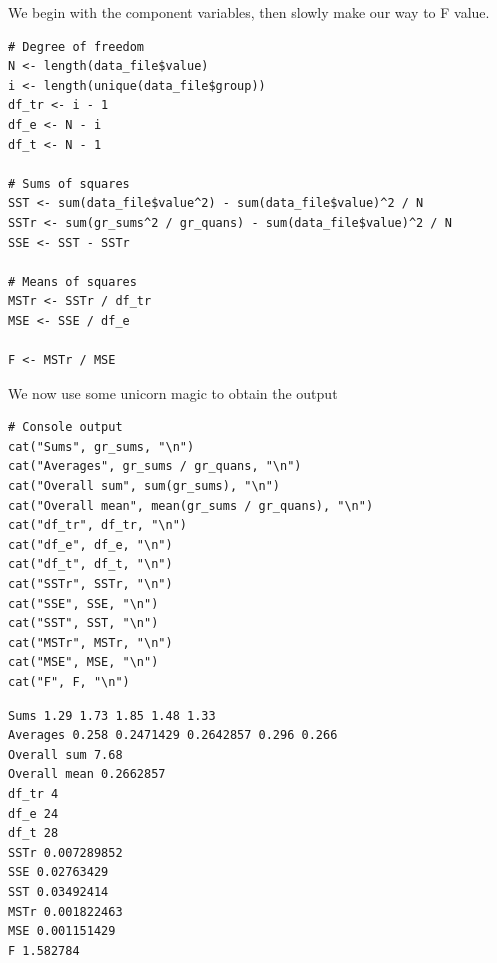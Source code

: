 \documentclass[a4paper]{article}
\numberwithin{equation}{section}
\begin{document}
We begin with the component variables, then slowly make our way to F value.
\begin{mdframed}[leftline=false,rightline=false,backgroundcolor=magenta!10,nobreak=true]
  \begin{verbatim}
# Degree of freedom
N <- length(data_file$value)
i <- length(unique(data_file$group))
df_tr <- i - 1
df_e <- N - i
df_t <- N - 1

# Sums of squares
SST <- sum(data_file$value^2) - sum(data_file$value)^2 / N
SSTr <- sum(gr_sums^2 / gr_quans) - sum(data_file$value)^2 / N
SSE <- SST - SSTr

# Means of squares
MSTr <- SSTr / df_tr
MSE <- SSE / df_e

F <- MSTr / MSE
  \end{verbatim}
\end{mdframed}

We now use some unicorn magic to obtain the output
\begin{mdframed}[leftline=false,rightline=false,backgroundcolor=magenta!10,nobreak=true]
  \begin{verbatim}
# Console output
cat("Sums", gr_sums, "\n")
cat("Averages", gr_sums / gr_quans, "\n")
cat("Overall sum", sum(gr_sums), "\n")
cat("Overall mean", mean(gr_sums / gr_quans), "\n")
cat("df_tr", df_tr, "\n")
cat("df_e", df_e, "\n")
cat("df_t", df_t, "\n")
cat("SSTr", SSTr, "\n")
cat("SSE", SSE, "\n")
cat("SST", SST, "\n")
cat("MSTr", MSTr, "\n")
cat("MSE", MSE, "\n")
cat("F", F, "\n")
  \end{verbatim}
\end{mdframed}

\begin{mdframed}[leftline=false,rightline=false,backgroundcolor=teal!10,nobreak=true]
  \begin{verbatim}
Sums 1.29 1.73 1.85 1.48 1.33
Averages 0.258 0.2471429 0.2642857 0.296 0.266
Overall sum 7.68
Overall mean 0.2662857
df_tr 4
df_e 24
df_t 28
SSTr 0.007289852
SSE 0.02763429
SST 0.03492414
MSTr 0.001822463
MSE 0.001151429
F 1.582784
  \end{verbatim}
\end{mdframed}
\end{document}
